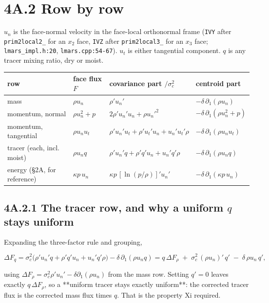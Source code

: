 \documentclass[11pt,a4paper]{article}
\begin{document}
\hrulefill

\section*{4A.2 Row by row}

$u_n$ is the face-normal velocity in the face-local orthonormal frame (\texttt{IVY}
after \texttt{prim2local2\_} for an $x_2$ face, \texttt{IVZ} after \texttt{prim2local3\_} for an $x_3$
face; \texttt{lmars\_impl.h:20}, \texttt{lmars.cpp:54-67}). $u_t$ is either tangential
component. $q$ is any tracer mixing ratio, dry or moist.

\begin{longtable}{llll}
\toprule
row & face flux $F$ & covariance part $/\sigma_c^2$ & centroid part \\
\midrule
mass & $\rho u_n$ & $\rho'u_n'$ & $-\delta\,\partial_1(\rho u_n)$ \\
momentum, normal & $\rho u_n^2+p$ & $2\rho'u_n'u_n+\rho u_n'^2$ & $-\delta\,\partial_1(\rho u_n^2+p)$ \\
momentum, tangential & $\rho u_nu_t$ & $\rho'u_n'u_t+\rho'u_t'u_n+u_n'u_t'\rho$ & $-\delta\,\partial_1(\rho u_nu_t)$ \\
tracer (each, incl. moist) & $\rho u_nq$ & $\rho'u_n'q+\rho'q'u_n+u_n'q'\rho$ & $-\delta\,\partial_1(\rho u_nq)$ \\
energy (§2A, for reference) & $\kappa p\,u_n$ & $\kappa p\,[\ln(p/\rho)]'u_n'$ & $-\delta\,\partial_1(\kappa p\,u_n)$ \\
\bottomrule
\end{longtable}

\subsection*{4A.2.1 The tracer row, and why a uniform $q$ stays uniform}

Expanding the three-factor rule and grouping,

\begin{equation*}
\Delta F_q=\sigma_c^2\big(\rho'u_n'q+\rho'q'u_n+u_n'q'\rho\big)-\delta\,\partial_1(\rho u_nq)
= q\,\Delta F_\rho \;+\; \sigma_c^2\,(\rho u_n)'\,q' \;-\;\delta\,\rho u_n\,q' ,
\tag{2.1}
\end{equation*}

using $\Delta F_\rho=\sigma_c^2\rho'u_n'-\delta\partial_1(\rho u_n)$ from the
mass row. Setting $q'=0$ leaves exactly $q\,\Delta F_\rho$, so a **uniform
tracer stays exactly uniform**: the corrected tracer flux is the corrected mass
flux times $q$. That is the property Xi required.
\end{document}
